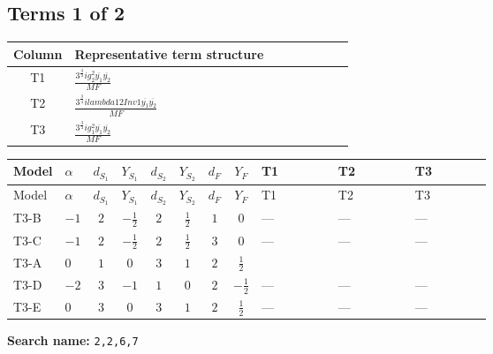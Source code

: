 \documentclass[8pt]{article}
\begin{document}
\begin{landscape}
\subsection*{Terms 1 of 2}
\begin{center}
\begin{tabular}{@{}c >{\raggedright\arraybackslash}p{0.82\linewidth}@{}}
\toprule
Column & Representative term structure \\
\midrule
T1 & \(\displaystyle \frac{3^{\frac{3}{4}} i g_{2}^{2} \overline{y_{1}} \overline{y_{2}}}{MF}\) \\
\midrule
T2 & \(\displaystyle \frac{3^{\frac{3}{4}} i lambda12Inv1 \overline{y_{1}} \overline{y_{2}}}{MF}\) \\
\midrule
T3 & \(\displaystyle \frac{3^{\frac{3}{4}} i g_{1}^{2} \overline{y_{1}} \overline{y_{2}}}{MF}\) \\
\midrule
\bottomrule
\end{tabular}
\end{center}
\smallskip
\tiny
\begin{longtable}{@{}llcccccc >{\raggedright\arraybackslash}p{0.21\linewidth} >{\raggedright\arraybackslash}p{0.21\linewidth} >{\raggedright\arraybackslash}p{0.21\linewidth}@{}}
\toprule
Model & $\alpha$ & $d_{S_1}$ & $Y_{S_1}$ & $d_{S_2}$ & $Y_{S_2}$ & $d_F$ & $Y_F$ & T1 & T2 & T3 \\
\midrule
\endfirsthead
\toprule
Model & $\alpha$ & $d_{S_1}$ & $Y_{S_1}$ & $d_{S_2}$ & $Y_{S_2}$ & $d_F$ & $Y_F$ & T1 & T2 & T3 \\
\midrule
\endhead
T3-B & $-1$ & $2$ & $-\frac{1}{2}$ & $2$ & $\frac{1}{2}$ & $1$ & $0$ & --- & --- & --- \\
\midrule
T3-C & $-1$ & $2$ & $-\frac{1}{2}$ & $2$ & $\frac{1}{2}$ & $3$ & $0$ & --- & --- & --- \\
\midrule
T3-A & $0$ & $1$ & $0$ & $3$ & $1$ & $2$ & $\frac{1}{2}$ & \scriptsize\adjustbox{max width=\linewidth}{$\begin{gathered} - \frac{17 \cdot 3^{\frac{3}{4}} i g_{2}^{2} \overline{y_{1}} \overline{y_{2}}}{24 MF}\end{gathered}$} & \scriptsize\adjustbox{max width=\linewidth}{$\begin{gathered} - \frac{3^{\frac{3}{4}} i lambda12Inv1 \overline{y_{1}} \overline{y_{2}}}{6 MF}\end{gathered}$} & \scriptsize\adjustbox{max width=\linewidth}{$\begin{gathered} - \frac{3^{\frac{3}{4}} i g_{1}^{2} \overline{y_{1}} \overline{y_{2}}}{8 MF}\end{gathered}$} \\
\midrule
T3-D & $-2$ & $3$ & $-1$ & $1$ & $0$ & $2$ & $-\frac{1}{2}$ & --- & --- & --- \\
\midrule
T3-E & $0$ & $3$ & $0$ & $3$ & $1$ & $2$ & $\frac{1}{2}$ & --- & --- & --- \\
\midrule
\bottomrule
\end{longtable}
\clearpage
\noindent\textbf{Search name: }\texttt{2,2,6,7}\par\smallskip

\end{landscape}
\end{document}
